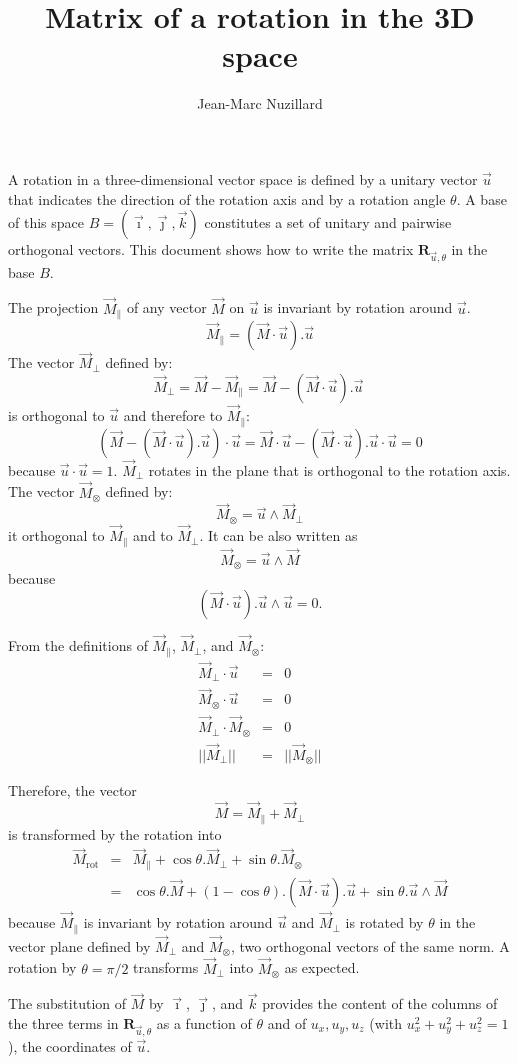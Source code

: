 \documentclass[10pt,a4paper]{article}
\newcommand{\ivec}{\vec{\imath}}
\newcommand{\jvec}{\vec{\jmath}}
\newcommand{\kvec}{\vec{k}}
\newcommand{\uvec}{\vec{u}}
\newcommand{\matrot}{\bm{R}_{\vec{u}, \theta}}
\newcommand{\mvec}{\vec{M}}
\newcommand{\mpar}{\mvec_{\|}}
\newcommand{\mper}{\mvec_{\bot}}
\newcommand{\mout}{\mvec_{\otimes}}
\newcommand{\mrot}{\mvec_{\mbox{rot}}}
\begin{document}
\title{Matrix of a rotation in the 3D space}
\author{Jean-Marc Nuzillard}
\maketitle
A rotation in a three-dimensional vector space is defined by a unitary vector $\vec{u}$
that indicates the direction of the rotation axis and by a rotation angle $\theta$.
A base of this space $B = (\ivec, \jvec, \kvec)$ constitutes a set of unitary and pairwise
orthogonal vectors.
This document shows how to write the matrix $\matrot$ in the base $B$.

The projection $\mpar$ of any vector $\mvec$ on $\uvec$ is invariant by rotation around $\uvec$.
\[ \mpar = (\mvec \cdot \uvec).\uvec\]
The vector $\mper$ defined by:
\[ \mper = \mvec - \mpar = \mvec - (\mvec \cdot \uvec).\uvec\ \]
is orthogonal to $\uvec$ and therefore to $\mpar$:
\[ (\mvec - (\mvec \cdot \uvec).\uvec) \cdot \uvec = \mvec \cdot \uvec - (\mvec \cdot \uvec).\uvec \cdot \uvec = 0 \]
because $\uvec \cdot \uvec = 1$.
$\mper$ rotates in the plane that is orthogonal to the rotation axis.
The vector $\mout$ defined by:
\[ \mout = \uvec \wedge \mper \]
it orthogonal to $\mpar$ and to $\mper$. It can be also written as 
\[ \mout = \uvec \wedge \mvec \]
because 
\[ (\mvec \cdot \uvec).\uvec \wedge \uvec = 0. \]

From the definitions of $\mpar$, $\mper$, and $\mout$:
\begin{eqnarray*}
\mper \cdot \uvec & = & 0 \\
\mout \cdot \uvec & = & 0 \\
\mper \cdot \mout & = & 0 \\
|| \mper || & = & || \mout ||
\end{eqnarray*}

Therefore, the vector
\[ \mvec = \mpar + \mper \]
is transformed by the rotation into
\begin{eqnarray*}
\mrot & = & \mpar + \cos\theta.\mper + \sin\theta.\mout \\
& = & \cos\theta.\mvec + (1 - \cos\theta).(\mvec \cdot \uvec).\uvec + \sin\theta.\uvec \wedge \mvec
\end{eqnarray*}
because $\mpar$ is invariant by rotation around $\uvec$ and $\mper$ is rotated by $\theta$ in the vector plane
defined by $\mper$ and $\mout$, two orthogonal vectors of the same norm.
A rotation by $\theta = \pi/2$ transforms $\mper$ into $\mout$ as expected.

The substitution of $\mvec$ by $\vec{\imath}$, $\vec{\jmath}$, and $\vec{k}$ provides
the content of the columns of the three terms in $\matrot$ as a function of $\theta$
and of $u_x, u_y, u_z$ (with $u_x^2 + u_y^2 + u_z^2 = 1$), the coordinates of $\uvec$.
\end{document}
